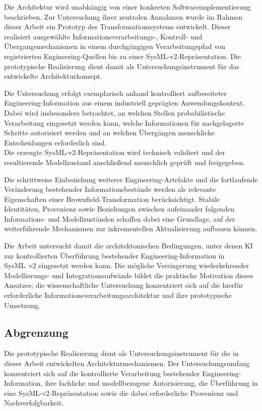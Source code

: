 Die Architektur wird unabhängig von einer konkreten
Softwareimplementierung beschrieben. Zur Untersuchung ihrer zentralen
Annahmen wurde im Rahmen dieser Arbeit ein Prototyp des
Transformationssystems entwickelt. Dieser realisiert ausgewählte
Informationsverarbeitungs-, Kontroll- und Übergangsmechanismen in einem
durchgängigen Verarbeitungspfad von registrierten Engineering-Quellen bis zu
einer SysML-v2-Repräsentation. Die prototypische Realisierung dient damit als
Untersuchungsinstrument für das entwickelte Architekturkonzept.

Die Untersuchung erfolgt exemplarisch anhand kontrolliert aufbereiteter
Engineering-Information aus einem industriell geprägten Anwendungskontext.
Dabei wird insbesondere betrachtet, an welchen Stellen probabilistische
Verarbeitung eingesetzt werden kann, welche Informationen für
nachgelagerte Schritte autorisiert werden und an welchen Übergängen
menschliche Entscheidungen erforderlich sind. \\ 
Die erzeugte
SysML-v2-Repräsentation wird technisch validiert und der resultierende
Modellzustand anschließend menschlich geprüft und freigegeben.

Die schrittweise Einbeziehung weiterer Engineering-Artefakte und die
fortlaufende Veränderung bestehender Informationsbestände werden als
relevante Eigenschaften einer Brownfield-Transformation berücksichtigt.
Stabile Identitäten, Provenienz sowie Beziehungen zwischen aufeinander
folgenden Informations- und Modellzuständen schaffen dabei eine Grundlage,
auf der weiterführende Mechanismen zur inkrementellen Aktualisierung
aufbauen können.

Die Arbeit untersucht damit die architektonischen Bedingungen, unter denen
KI zur kontrollierten Überführung bestehender Engineering-Information in
SysML~v2 eingesetzt werden kann. Die mögliche Verringerung wiederkehrender
Modellierungs- und Integrationsaufwände bildet die praktische Motivation
dieses Ansatzes; die wissenschaftliche Untersuchung konzentriert sich auf
die hierfür erforderliche Informationsverarbeitungsarchitektur und ihre
prototypische Umsetzung.

\subsection{Abgrenzung}
\label{sec:abgrenzung}

Die prototypische Realisierung dient als Untersuchungsinstrument für die in
dieser Arbeit entwickelten Architekturmechanismen. Der Untersuchungsumfang
konzentriert sich auf die kontrollierte Verarbeitung bestehender
Engineering-Information, ihre fachliche und modellbezogene Autorisierung,
die Überführung in eine SysML-v2-Repräsentation sowie die dabei erforderliche
Provenienz und Nachverfolgbarkeit.

